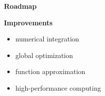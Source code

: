 \begin{frame}\begin{center}
\LARGE\textbf{Roadmap}
\end{center}\end{frame}
\begin{frame}

\textbf{Improvements}\vspace{0.5cm}
\begin{itemize}\setlength\itemsep{1em}
\item numerical integration
\item global optimization
\item function approximation
\item high-performance computing
\end{itemize}
\end{frame}
